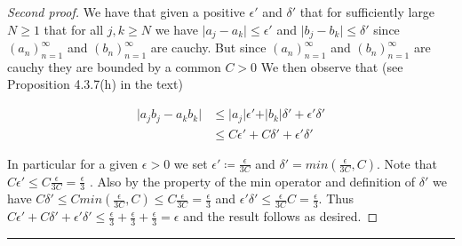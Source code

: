 \documentclass{article}
\newcommand{\lined}{\noindent\rule{\textwidth}{1pt}}
\begin{document}
	
	\begin{proof}[Second proof]
		We have that given a positive $\epsilon'$ and $\delta'$  that for sufficiently large $N \geq 1$ that for all $j,k \geq N$ we have $\lvert a_j - a_k \rvert \leq \epsilon'$ and $\lvert b_j - b_k \rvert \leq \delta'$ since 
$(a_n)_{n = 1}^{\infty}$ and $(b_n)_{n = 1}^{\infty}$ are cauchy. But since $(a_n)_{n = 1}^{\infty}$ and $(b_n)_{n = 1}^{\infty}$ are cauchy they are bounded by a common $C > 0$ We then observe that (see Proposition 4.3.7(h) in the text)

\begin{align*}
\lvert a_{j}b_{j} -  a_{k}b_{k} \rvert  & \leq \lvert a_j \rvert \epsilon' + \rvert b_k \lvert \delta' + \epsilon' \delta' \\ & \leq C \epsilon' + C \delta' + \epsilon' \delta'
\end{align*}

\noindent In particular for a given $\epsilon > 0$ we set
$\epsilon' \coloneqq \frac{\epsilon}{3C}$ and $\delta' = min(\frac{\epsilon}{3C},C)$. Note that $C \epsilon' \leq C \frac{\epsilon}{3C} = \frac{\epsilon}{3}$ . Also by the property of the min operator and definition of $\delta'$ we have $C \delta' \leq C min(\frac{\epsilon}{3C},C) \leq C \frac{\epsilon}{3C} = \frac{\epsilon}{3}$ and $\epsilon' \delta' \leq  \frac{\epsilon}{3C} C  = \frac{\epsilon}{3}$. Thus $ C \epsilon' + C \delta' + \epsilon' \delta' \leq \frac{\epsilon}{3} + \frac{\epsilon}{3} + \frac{\epsilon}{3} = \epsilon$ and the result follows as desired.

	\end{proof}
	
	\lined
	

	
\end{document}
